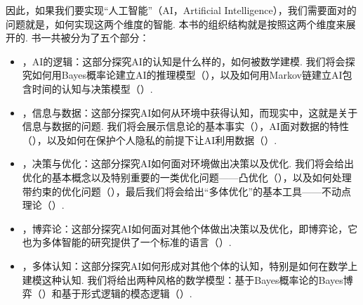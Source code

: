 因此，如果我们要实现“人工智能”（AI，Artificial Intelligence），我们需要面对的问题就是，如何实现这两个维度的智能. 本书的组织结构就是按照这两个维度来展开的. 书一共被分为了五个部分：
\begin{itemize}
    \item {}，AI的逻辑：这部分探究AI的认知是什么样的，如何被数学建模. 我们将会探究如何用Bayes概率论建立AI的推理模型（），以及如何用Markov链建立AI包含时间的认知与决策模型（）. 
    \item  {}，信息与数据：这部分探究AI如何从环境中获得认知，而现实中，这就是关于信息与数据的问题. 我们将会展示信息论的基本事实（），AI面对数据的特性（），以及如何在保护个人隐私的前提下让AI利用数据（）. 
    \item  {}，决策与优化：这部分探究AI如何面对环境做出决策以及优化. 我们将会给出优化的基本概念以及特别重要的一类优化问题——凸优化（），以及如何处理带约束的优化问题（），最后我们将会给出“多体优化”的基本工具——不动点理论（）. 
    \item  {}，博弈论：这部分探究AI如何面对其他个体做出决策以及优化，即博弈论，它也为多体智能的研究提供了一个标准的语言（）. 
    \item  {}，多体认知：这部分探究AI如何形成对其他个体的认知，特别是如何在数学上建模这种认知. 我们将给出两种风格的数学模型：基于Bayes概率论的Bayes博弈（）和基于形式逻辑的模态逻辑（）. 
\end{itemize}

